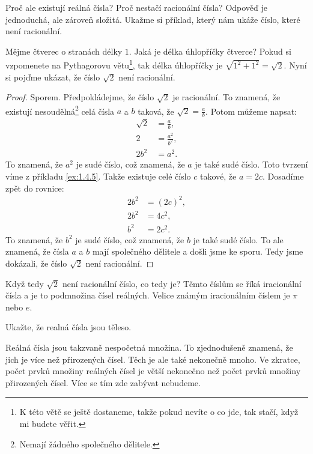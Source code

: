 Proč ale existují reálná čísla? Proč nestačí racionální čísla? Odpověď je jednoduchá, ale zároveň složitá. Ukažme si příklad, který nám ukáže číslo, které není racionální.

\begin{example}
  Mějme čtverec o stranách délky $1$. Jaká je délka úhlopříčky čtverce? Pokud si vzpomenete na Pythagorovu větu\footnote{K této větě se ještě dostaneme, takže pokud nevíte o co jde, tak stačí, když mi budete věřit.}, tak délka úhlopříčky je $\sqrt{1^2 + 1^2} = \sqrt{2}$. Nyní si pojďme ukázat, že číslo $\sqrt{2}$ není racionální.

  \begin{proof}
    Sporem. Předpokládejme, že číslo $\sqrt{2}$ je racionální. To znamená, že existují nesoudělná\footnote{Nemají žádného společného dělitele.} celá čísla $a$ a $b$ taková, že $\sqrt{2} = \frac{a}{b}$. Potom můžeme napsat:
    \begin{align*}
      \sqrt{2} &= \frac{a}{b},\\
      2 &= \frac{a^2}{b^2},\\
      2b^2 &= a^2.
    \end{align*}
    To znamená, že $a^2$ je sudé číslo, což znamená, že $a$ je také sudé číslo. Toto tvrzení víme z příkladu \ref{ex:1.4.5}. Takže existuje celé číslo $c$ takové, že $a = 2c$. Dosadíme zpět do rovnice:
    \begin{align*}
      2b^2 &= {(2c)}^2,\\ 
      2b^2 &= 4c^2,\\
      b^2 &= 2c^2.
    \end{align*}
    To znamená, že $b^2$ je sudé číslo, což znamená, že $b$ je také sudé číslo. To ale znamená, že čísla $a$ a $b$ mají společného dělitele a došli jsme ke sporu. Tedy jsme dokázali, že číslo $\sqrt{2}$ není racionální.
  \end{proof}
\end{example}

Když tedy $\sqrt{2}$ není racionální číslo, co tedy je? Těmto číslům se říká iracionální čísla a je to podmnožina čísel reálných. Velice známým iracionálním číslem je $\pi$ nebo $e$.

\begin{problem}
  Ukažte, že realná čísla jsou těleso.
\end{problem}

\begin{note}
  Reálná čísla jsou takzvaně nespočetná množina. To zjednodušeně znamená, že jich je více než přirozených čísel. Těch je ale také nekonečně mnoho. Ve zkratce, počet prvků množiny reálných čísel je větší nekonečno než počet prvků množiny přirozených čísel. Více se tím zde zabývat nebudeme.
\end{note}

